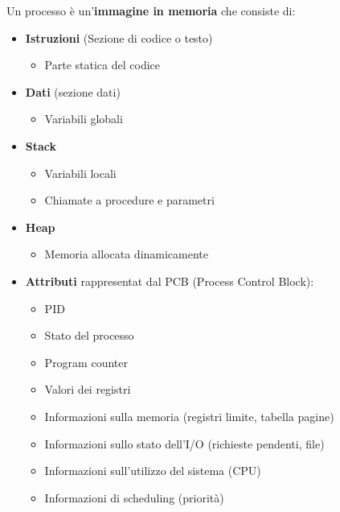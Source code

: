 \documentclass[a4paper]{article}
\begin{document}
\noindent
Un processo è un'\textbf{immagine in memoria} che consiste di:
\begin{itemize}
  \item \textbf{Istruzioni} (Sezione di codice o testo)
    \begin{itemize}
      \item Parte statica del codice
    \end{itemize}

  \item \textbf{Dati} (sezione dati)
    \begin{itemize}
      \item Variabili globali
    \end{itemize}

  \item \textbf{Stack}
    \begin{itemize}
      \item Variabili locali
      \item Chiamate a procedure e parametri
    \end{itemize}

  \item \textbf{Heap}
    \begin{itemize}
      \item Memoria allocata dinamicamente
    \end{itemize}

  \item \textbf{Attributi} rappresentat dal PCB (Process Control Block):
    \begin{itemize}
      \item PID
      \item Stato del processo
      \item Program counter
      \item Valori dei registri
      \item Informazioni sulla memoria (registri limite, tabella pagine)
      \item Informazioni sullo stato dell'I/O (richieste pendenti, file)
      \item Informazioni sull'utilizzo del sistema (CPU)
      \item Informazioni di scheduling (priorità)
    \end{itemize}
\end{itemize}
\end{document}
